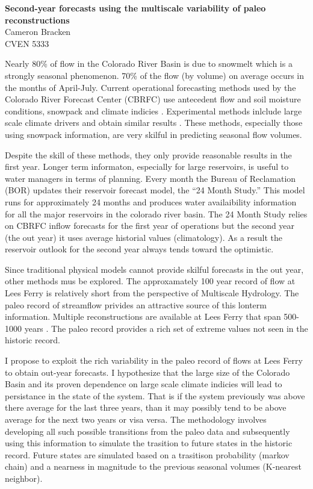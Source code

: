 \documentclass[11pt]{article}
\begin{document}
{\large\bf Second-year forecasts using the multiscale variability of paleo reconstructions}\\
Cameron Bracken\\
CVEN 5333

Nearly 80\% of flow in the Colorado River Basin is due to snowmelt which is a strongly seasonal phenomenon.  70\% of the flow (by volume) on average occurs in the months of April-July.  Current operational forecasting methods used by the Colorado River Forecast Center (CBRFC) use antecedent flow and soil moisture conditions, snowpack and climate indicies \citep{Brandon2005}.  Experimental methods inlclude large scale climate drivers and obtain similar results \citep{Bracken:2010p2682, Regonda2006, Grantz2005}.  These methods, especially those using snowpack information, are very skilful in predicting seasonal flow volumes.  

Despite the skill of these methods, they only provide reasonable results in the first year.  Longer term informaton, especially for large reservoirs, is useful to water managers in terms of planning. Every month the Bureau of Reclamation (BOR) updates their reservoir forecast model, the ``24 Month Study.''  This model runs for approximately 24 months and produces water availaibility information for all the major reservoirs in the colorado river basin.  The 24 Month Study relies on CBRFC inflow forecasts for the first year of operations but the second year (the out year) it uses average historial values (climatology).  As a result the reservoir outlook for the second year always tends toward the optimistic. 

Since traditional physical models cannot provide skilful forecasts in the out year, other methods mus be explored.  The approxamately 100 year record of flow at Lees Ferry is relatively short from the perspective of Multiscale Hydrology.  The paleo record of streamflow privides an attractive source of this lonterm information.  Multiple reconstructions are available at Lees Ferry that span 500-1000 years \cite{Woodhouse:2006p1287, Gangopadhyay:2009p61}.  The paleo record provides a rich set of extreme values not seen in the historic record. 

I propose to exploit the rich variability in the paleo record of flows at Lees Ferry to obtain out-year forecasts.  I hypothesize that the large size of the Colorado Basin and its proven dependence on large scale climate indicies will lead to persistance in the state of the system. That is if the system previously was above there average for the last three years, than it may possibly tend to be  above average for the next two years or visa versa.  The methodology involves developing all such possible transitions from the paleo data and subsequently using this information to simulate the trasition to future states in the historic record.  Future states are simulated based on a trasitison probability (markov chain) and a nearness in magnitude to the previous seasonal volumes (K-nearest neighbor).  


\end{document}
